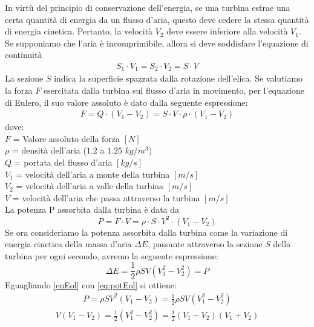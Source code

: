 In virtù del principio di conservazione dell'energia, se una turbina estrae una certa quantità di energia da un flusso d'aria, questo deve cedere la stessa quantità di energia cinetica. Pertanto, la velocità $V_2$ deve essere inferiore alla velocità $V_1$. Se supponiamo che l'aria è incomprimibile, allora si deve soddisfare l'equazione di continuità
\begin{align*}
S_1 \cdot V_1 = S_2 \cdot V_2 = S \cdot V
\end{align*}
La sezione $S$ indica la superficie spazzata dalla rotazione dell'elica.
Se valutiamo la forza $F$ esercitata dalla turbina sul flusso d'aria in movimento, per l'equazione di Eulero, il suo valore assoluto è dato dalla seguente espressione:
\begin{align*}
F = Q \cdot \left( V_1 - V_2 \right) = S \cdot V \cdot \rho \cdot \left( V_1 - V_2 \right)
\end{align*}
dove:\\
$F$ = Valore assoluto della forza $[N]$\\
$\rho$ = densità dell'aria ($1.2$ a $1.25$ $kg/m^3$)\\
$Q$ = portata del flusso d'aria $[kg/s]$\\
$V_1$ = velocità dell'aria a monte della turbina $[m/s]$\\
$V_2$ = velocità dell'aria a valle della turbina $[m/s]$\\
$V$ = velocità dell'aria che passa attraverso la turbina $[m/s]$\\[2mm]
La potenza P assorbita dalla turbina è data da 
\begin{equation}\label{eq:potEol}
P = F \cdot V = \rho \cdot S \cdot V^2 \cdot \left( V_1 - V_2 \right)
\end{equation}
Se ora consideriamo la potenza assorbita dalla turbina come la variazione di energia cinetica della massa d'aria $\Delta E$, passante attraverso la sezione $S$ della turbina per ogni secondo, avremo la seguente espressione:
\begin{equation}\label{enEol}
\Delta E = \frac{1}{2} \rho	S V \left(V_1^2 - V_2^2 \right) = P
\end{equation}
Eguagliando \ref{enEol} con \ref{eq:potEol} si ottiene:
\begin{align*}
P = \rho S V^2 \left(V_1 - V_2 \right) = \frac{1}{2} \rho S V \left(V_1^2-V_2^2 \right)
\end{align*}
\begin{align*}
V \left(V_1 - V_2 \right) = \frac{1}{2} \left(V_1^2-V_2^2 \right) = \frac{1}{2} \left(V_1-V_2 \right)\left(V_1+V_2 \right)
\end{align*}
